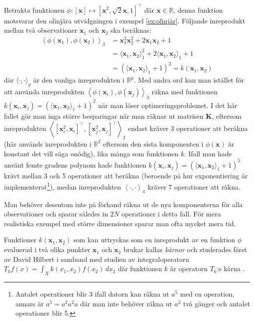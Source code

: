 \documentclass[a4paper, 12pt]{report}
\theoremstyle{definition}
\theoremstyle{remark}
\newcommand{\bfx}{\mathbf{x}}
\newcommand{\llangle}{\left\langle}
\newcommand{\rrangle}{\right\rangle}
\newcommand{\inner}[2]{\llangle #1, #2 \rrangle}
\begin{document}
	Betrakta funktionen $\phi:\left[\bfx\right]\longmapsto \left[\bfx^2,\sqrt{2}\bfx, 1\right]^\intercal$ där $\bfx\in\mathbb{R}$, denna funktion motsvarar den olinjära utvidgningen i exempel \ref{ex:olinjär}. Följande inreprodukt mellan två observationer $\mathbf{x}_1$ och $\mathbf{x}_2$ ska beräknas:
	\begin{align*}
	\left\langle \phi\left(\mathbf{x}_1\right), \phi\left(\mathbf{x}_2\right) \right\rangle_3 &= \bfx_1^2\bfx_2^2 + 2\bfx_1\bfx_2 + 1\\
	&= \langle \bfx_1, \bfx_2 \rangle_1^2 + 2\langle \bfx_1, \bfx_2 \rangle_1 + 1\\
	&= \left(\langle\bfx_1, \bfx_2 \rangle_1 + 1\right)^2 = k\left(\bfx_1, \bfx_2\right)
	\end{align*}
	där $\langle \cdot,\cdot \rangle_p$ är den vanliga inreprodukten i $\mathbb{R}^p$. Med andra ord kan man istället för att använda inre\-produkten $\inner{\phi\left(\bfx_i\right)}{\phi\left(\bfx_j\right)}_3$ räkna med funktionen $k\left(\bfx_i, \bfx_j\right)=\left(\langle\bfx_1, \bfx_2 \rangle_1 + 1\right)^2$ när man löser optimeringsproblemet. I det här fallet gör man inga större besparingar när man räknar ut matrisen $\mathbf{K}$, efter\-som inreprodukten $\inner{[\bfx_i^2, \bfx_i]^\intercal}{[\bfx_j^2, \bfx_j]^\intercal}_2$ endast kräver 3 operationer att beräkna (här används inreprodukten i $\mathbb{R}^2$  eftersom den sista komponenten i $\phi(\bfx)$ är konstant det vill säga onödig), lika många som funktionen $k$. Ifall man hade använt femte gradens polynom hade funktionen $k\left(\bfx_i, \bfx_j\right)=\left(\langle\bfx_1, \bfx_2 \rangle_1 + 1\right)^5$ krävt mellan 3 och 5 operationer att beräkna (beroende på hur exponentiering är implementerat\footnote{Antalet operationer blir 3 ifall datorn kan räkna ut $a^5$ med en operation, annars är $a^5=a^2a^2a$ där man inte behöver räkna ut $a^2$ två gånger och antalet operationer blir 5.}), medan inreprodukten $\inner{\cdot}{\cdot}_4$ kräver 7 operationer att räkna.
	
	Man behöver dessutom inte på förhand räkna ut de nya komponenterna för alla observationer och sparar således in $2N$ operationer i detta fall. För mera realistiska exempel med större dimensioner sparar man ofta mycket mera tid.

Funktioner $k\left(\bfx_1, \bfx_2\right)$ som kan uttryckas som en inreprodukt av en funktion $\phi$ evaluerad i två olika punkter $\bfx_1$ och $\bfx_2$ brukar kallas \emph{kärnor} och studerades först av David Hilbert \cite{Hilbert} i samband med studien av integral\-operatorn $T_k f\left(x\right)=\int_{X}k\left(x_1, x_2\right)f\left(x_2\right)\,dx_2$ där funktionen $k$ är operatorn $T_k$:s kärna \cite{LearningKernels}.
\end{document}
